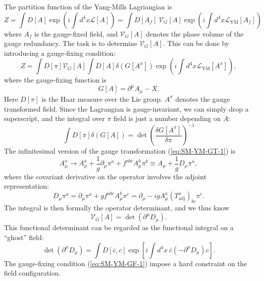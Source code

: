 The partition function of the Yang-Mills Lagriangian is
\begin{equation}
	Z = \int D[A] \exp\left(i \int d^4x \mathcal{L}[A]\right)
	= \int D[A_{f}]\ \mathcal V_G[A] \exp\left(i \int d^4x \mathcal{L}_{\mathrm{YM}}[A_f]\right)
\end{equation}
where $A_f$ is the gauge-fixed field, and $\mathcal V_G[A]$ denotes the phase volume of the gauge redundancy.
The task is to determine $\mathcal V_G[A]$. 
This can be done by introducing a gauge-fixing condition:
\begin{equation}
	Z = \int D[\pi] \mathcal V_G[A]\int D[A] \delta(G[A^\pi]) \exp\left(i \int d^4x \mathcal{L}_{\mathrm{YM}}[A^\pi]\right),
\end{equation}
where the gauge-fixing function is 
\begin{equation}\label{eq:SM-YM-GF-1}
	G[A] = \partial^\mu A_\mu - X.
\end{equation}
Here $D[\pi]$ is the Haar measure over the Lie group.
$A^\pi$ denotes the gauge transformed field. 
Since the Lagrangian is gauge-invariant, we can simply drop a superscript, and the integral over $\pi$ field is just a number depending on $A$:
\begin{equation}
	\int D[\pi] \delta(G[A]) = \det\left(\frac{\delta G[A^\pi]}{\delta \pi}\right)^{-1}
\end{equation}
The infinitesimal version of the gauge transformation (\ref{eq:SM-YM-GT-1}) is
\begin{equation}
	A_\mu^a \rightarrow A_\mu^a +\frac{1}{g}\partial_\mu \pi^a + f^{abc}A^b_\mu \pi^b
	\equiv A_\mu + \frac{1}{g} D_\mu \pi^a,
\end{equation}
where the covariant derivative on the operator involves the adjoint representation:
\begin{equation}
	D_\mu \pi^a = \partial_\mu \pi^a + g f^{abc} A_\mu^b \pi^c = \partial_\mu -i g A_\mu^a \left(T^a_{\mathrm{adj}}\right)_{bc} \pi^c.
\end{equation}
The integral is then formally the operator determinant, and we thus know
\begin{equation}
	 \mathcal V_G[A] = \det(\partial^\mu D_\mu).
\end{equation}
This functional determinant can be regarded as the functional integral on a ``ghost'' field:
\begin{equation}
	\det(\partial^\mu D_\mu) = \int D[\bar c,c] \exp\left[i \int d^4 x\ \bar c (-\partial^\mu D_\mu)c \right].
\end{equation}
The gauge-fixing condition (\ref{eq:SM-YM-GF-1}) impose a hard constraint on the field configuration.
